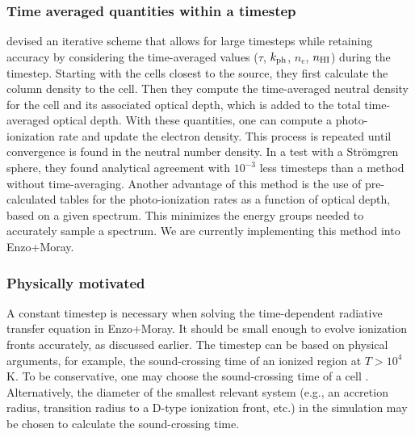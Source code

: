 \documentclass[useAMS,usenatbib,a4paper]{mn2e}
\begin{document}
\subsubsection{Time averaged quantities within a timestep}

\citet{Mellema06} devised an iterative scheme that allows for large
timesteps while retaining accuracy by considering the time-averaged
values ($\tau$, $k_{\rm ph}$, $n_e$, $n_{\rm HI}$) during the
timestep.  Starting with the cells closest to the source, they first
calculate the column density to the cell.  Then they compute the
time-averaged neutral density for the cell and its associated optical
depth, which is added to the total time-averaged optical depth.  With
these quantities, one can compute a photo-ionization rate and update
the electron density.  This process is repeated until convergence is
found in the neutral number density.  In a test with a Str\"{o}mgren
sphere, they found analytical agreement with $10^{-3}$ less timesteps
than a method without time-averaging.  Another advantage of this
method is the use of pre-calculated tables for the photo-ionization
rates as a function of optical depth, based on a given spectrum.  This
minimizes the energy groups needed to accurately sample a spectrum.
We are currently implementing this method into Enzo+Moray.

\subsubsection{Physically motivated}
\label{sec:dt_const}

A constant timestep is necessary when solving the time-dependent
radiative transfer equation in Enzo+Moray.  It should be small enough
to evolve ionization fronts accurately, as discussed earlier.  The
timestep can be based on physical arguments, for example, the
sound-crossing time of an ionized region at $T > 10^4$ K.  To be
conservative, one may choose the sound-crossing time of a cell
\citep[e.g.][]{Abel07, Wise08_Gal}.  Alternatively, the diameter of
the smallest relevant system (e.g., an accretion radius, transition
radius to a D-type ionization front, etc.) in the simulation may be
chosen to calculate the sound-crossing time.
\end{document}
